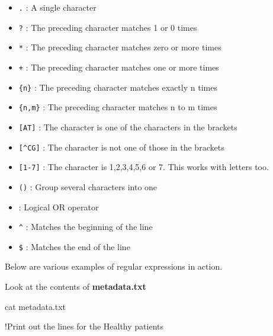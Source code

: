 \documentclass[
  letterpaper,
  DIV=11,
  numbers=noendperiod]{scrreprt}
\newenvironment{Shaded}{\begin{snugshade}}{\end{snugshade}}
\newcommand{\FunctionTok}[1]{\textcolor[rgb]{0.28,0.35,0.67}{#1}}
\newcommand{\NormalTok}[1]{\textcolor[rgb]{0.00,0.23,0.31}{#1}}
\providecommand{\tightlist}{%
  \setlength{\itemsep}{0pt}\setlength{\parskip}{0pt}}
\begin{document}
\begin{itemize}
\tightlist
\item
  \texttt{.} : A single character\\
\item
  \texttt{?} : The preceding character matches 1 or 0 times\\
\item
  \texttt{*} : The preceding character matches zero or more times\\
\item
  \texttt{+} : The preceding character matches one or more times\\
\item
  \texttt{\{n\}} : The preceding character matches exactly n times\\
\item
  \texttt{\{n,m\}} : The preceding character matches n to m times\\
\item
  \texttt{{[}AT{]}} : The character is one of the characters in the
  brackets\\
\item
  \texttt{{[}\^{}CG{]}} : The character is not one of those in the
  brackets\\
\item
  \texttt{{[}1-7{]}} : The character is 1,2,3,4,5,6 or 7. This works
  with letters too.\\
\item
  \texttt{()} : Group several characters into one\\
\item
  \texttt{\textbar{}} : Logical OR operator\\
\item
  \texttt{\^{}} : Matches the beginning of the line\\
\item
  \texttt{\$} : Matches the end of the line
\end{itemize}

Below are various examples of regular expressions in action.

Look at the contents of \textbf{metadata.txt}

\begin{Shaded}
\begin{Highlighting}[]
\FunctionTok{cat}\NormalTok{ metadata.txt}
\end{Highlighting}
\end{Shaded}

!Print out the lines for the Healthy patients
\end{document}
